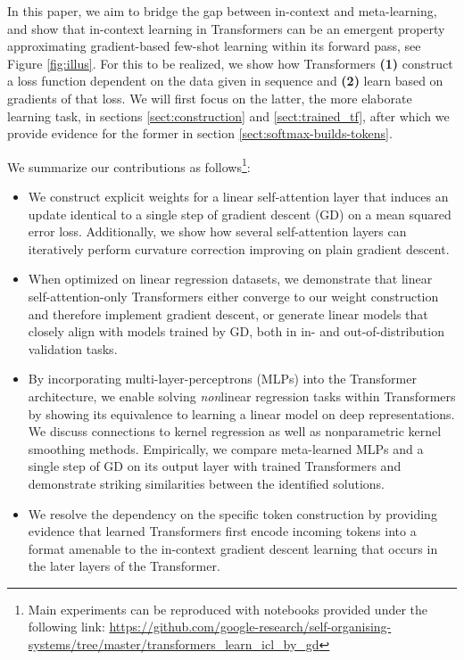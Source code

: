 \documentclass{article}
\theoremstyle{plain}
\theoremstyle{definition}
\theoremstyle{remark}
\begin{document}
In this paper, we aim to bridge the gap between in-context and meta-learning, and show that in-context learning in Transformers can be an emergent property approximating gradient-based few-shot learning within its forward pass, see Figure \ref{fig:illus}. For this to be realized, we show how Transformers \textbf{(1)} construct a loss function dependent on the data given in sequence and \textbf{(2)} learn based on gradients of that loss. We will first focus on the latter, the more elaborate learning task, in sections \ref{sect:construction} and \ref{sect:trained_tf}, after which we provide evidence for the former in section \ref{sect:softmax-builds-tokens}.

We summarize our contributions as follows\footnote{Main experiments can be reproduced with notebooks provided under the following link: \url{https://github.com/google-research/self-organising-systems/tree/master/transformers_learn_icl_by_gd}}:
\begin{itemize}
    \item We construct explicit weights for a linear self-attention layer that induces an update identical to a single step of gradient descent (GD) on a mean squared error loss. Additionally, we show how several self-attention layers can iteratively perform curvature correction improving on plain gradient descent.
    \item When optimized on linear regression datasets, we demonstrate that linear self-attention-only Transformers either converge to our weight construction and therefore implement gradient descent, or generate linear models that closely align with models trained by GD, both in in- and out-of-distribution validation tasks.
    \item By incorporating multi-layer-perceptrons (MLPs) into the Transformer architecture, we enable solving \textit{non}linear regression tasks within Transformers by showing its equivalence to learning a linear model on deep representations. We discuss connections to kernel regression as well as nonparametric kernel smoothing methods. Empirically, we compare meta-learned MLPs and a single step of GD on its output layer with trained Transformers and demonstrate striking similarities between the identified solutions.
    \item We resolve the dependency on the specific token construction by providing evidence that learned Transformers first encode incoming tokens into a format amenable to the in-context gradient descent learning that occurs in the later layers of the Transformer.
\end{itemize}
\end{document}

